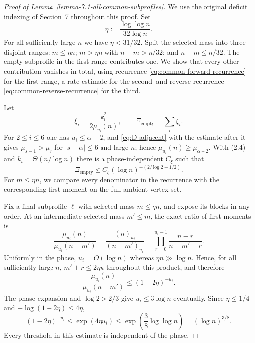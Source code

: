 \documentclass[a4paper,10pt,reqno]{amsart}
\numberwithin{equation}{section}
\newcommand{\displayheading}[1]{\par\addvspace{0.68\baselineskip}\noindent{\scshape #1.}\par\nobreak\smallskip\noindent}
\theoremstyle{plain}
\theoremstyle{remark}
\begin{document}
\begin{proof}[Proof of Lemma~\ref{lemma-7.1-all-common-subprofiles}]
We use the original deficit indexing of Section~7 throughout this proof.
Set
\[
  \eta:=\frac{\log\log n}{32\log n}.
\]
For all sufficiently large $n$ we have $\eta<31/32$. Split the selected
mass into three disjoint ranges: $m\le\eta n$; $m>\eta n$ with
$n-m>n/32$; and $n-m\le n/32$. The empty subprofile in the first range
contributes one. We show that every other contribution vanishes in total,
using recurrence \eqref{eq:common-forward-recurrence} for the first range, a rate estimate for the second,
and reverse recurrence \eqref{eq:common-reverse-recurrence} for the third.


\displayheading{Small selected mass}

Let
\begin{equation}
  \xi_i=\frac{k_i^2}{2\mu_{u_i}(n)},
  \qquad
  \Xi_{\mathrm{empty}}=\sum_i\xi_i.
  \label{eq:G-xi}
\end{equation}
For $2\le i\le6$ one has $u_i\le\alpha-2$, and \eqref{eq:D-adjacent} with
the estimate after it gives $\mu_{s-1}>\mu_s$ for $|s-\alpha|\le6$ and large
$n$; hence $\mu_{u_i}(n)\ge\mu_{\alpha-2}$. With (2.4) and
$k_i=\Theta(n/\log n)$ there is a phase-independent $C_\xi$ such that
\begin{equation}
  \Xi_{\mathrm{empty}}\le C_\xi(\log n)^{-(2/\log 2-1/2)}.
  \label{eq:G-empty-bound}
\end{equation}
For $m\le\eta n$, we compare every denominator in the recurrence with
the corresponding first moment on the full ambient vertex set.

Fix a final subprofile $\ell$ with selected mass $m\le\eta n$, and expose its
blocks in any order. At an intermediate selected mass $m'\le m$, the exact
ratio of first moments is
\[
  \frac{\mu_{u_i}(n)}{\mu_{u_i}(n-m')}
  =\frac{(n)_{u_i}}{(n-m')_{u_i}}
  =\prod_{r=0}^{u_i-1}
    \frac{n-r}{n-m'-r}.
\]
Uniformly in the phase, $u_i=O(\log n)$ whereas
$\eta n\gg\log n$. Hence, for all sufficiently large $n$,
$m'+r\le2\eta n$ throughout this product, and therefore
\[
  \frac{\mu_{u_i}(n)}{\mu_{u_i}(n-m')}
  \le(1-2\eta)^{-u_i}.
\]
The phase expansion and $\log 2>2/3$ give $u_i\le3\log n$ eventually. Since
$\eta\le1/4$ and $-\log(1-2\eta)\le4\eta$,
\begin{equation}
  (1-2\eta)^{-u_i}
  \le\exp(4\eta u_i)
  \le\exp\!\left(\frac38\log\log n\right)
  =(\log n)^{3/8}.
  \label{eq:G-ratio}
\end{equation}
Every threshold in this estimate is independent of the phase.


\end{proof}
\end{document}
